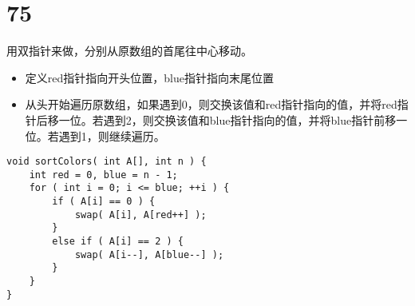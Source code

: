 \documentclass[12pt,a4paper]{article}
\begin{document}
\section{75}
\begin{CJK}{UTF8}{gbsn}
用双指针来做，分别从原数组的首尾往中心移动。
\begin{itemize}
\item 定义red指针指向开头位置，blue指针指向末尾位置
\item 从头开始遍历原数组，如果遇到0，则交换该值和red指针指向的值，并将red指针后移一位。若遇到2，则交换该值和blue指针指向的值，并将blue指针前移一位。若遇到1，则继续遍历。
\end{itemize}
\end{CJK}
\begin{lstlisting}
void sortColors( int A[], int n ) {
	int red = 0, blue = n - 1;
	for ( int i = 0; i <= blue; ++i ) {
		if ( A[i] == 0 ) {
			swap( A[i], A[red++] );
		}
		else if ( A[i] == 2 ) {
			swap( A[i--], A[blue--] );
		}
	}
}
\end{lstlisting}
\end{document}
